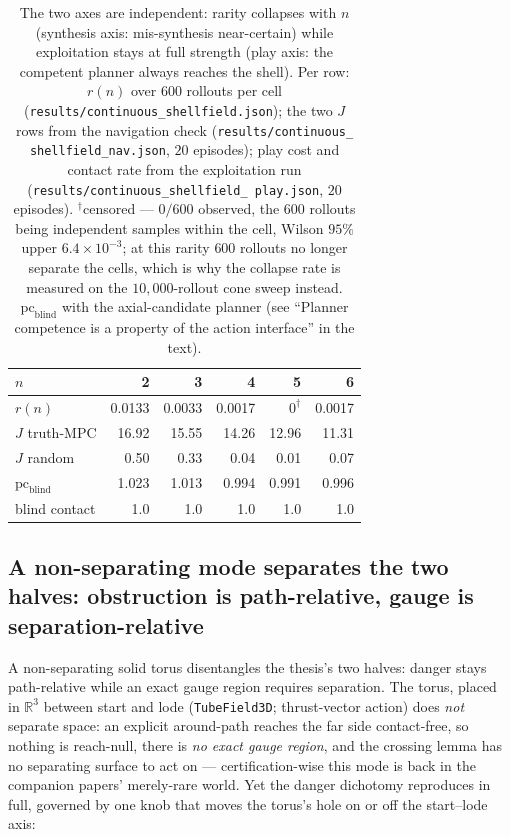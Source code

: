 \documentclass[11pt]{article}
\theoremstyle{remark}
\begin{document}
\begin{table}[h]
\centering
\small
\begin{tabular}{lrrrrr}
\toprule
$n$ & 2 & 3 & 4 & 5 & 6 \\
\midrule
$r(n)$ & 0.0133 & 0.0033 & 0.0017 & $0^{\dagger}$ & 0.0017 \\
$J$ truth-MPC & 16.92 & 15.55 & 14.26 & 12.96 & 11.31 \\
$J$ random & 0.50 & 0.33 & 0.04 & 0.01 & 0.07 \\
$\mathrm{pc}_{\mathrm{blind}}$ & 1.023 & 1.013 & 0.994 & 0.991 & 0.996 \\
blind contact & 1.0 & 1.0 & 1.0 & 1.0 & 1.0 \\
\bottomrule
\end{tabular}
\caption{The two axes are independent: rarity collapses with $n$
(synthesis axis: mis-synthesis near-certain) while exploitation stays at
full strength (play axis: the competent planner always reaches the shell).
Per row: $r(n)$ over $600$ rollouts per cell
(\texttt{results/continuous\_shellfield.json}); the two $J$ rows from
the navigation check (\texttt{results/continuous\_\allowbreak
shellfield\_\allowbreak nav.json}, $20$ episodes); play cost and contact
rate from the exploitation run
(\texttt{results/continuous\_\allowbreak shellfield\_\allowbreak
play.json}, $20$ episodes). $^{\dagger}$censored ---
$0/600$ observed, the $600$ rollouts being independent samples within the
cell, Wilson $95\%$ upper $6.4 \times 10^{-3}$; at this rarity $600$
rollouts no longer separate the cells, which is why the collapse rate is
measured on the $10{,}000$-rollout cone sweep instead.
$\mathrm{pc}_{\mathrm{blind}}$ with the axial-candidate planner (see
``Planner competence is a property of the action interface'' in the
text).}
\label{tab:ndim}
\end{table}

\subsection{A non-separating mode separates the two halves: obstruction
is path-relative, gauge is separation-relative}
\label{sec:tube}

A non-separating solid torus disentangles the thesis's two halves:
danger stays path-relative while an exact gauge region requires
separation. The torus, placed in $\mathbb{R}^3$ between start and lode
(\texttt{TubeField3D}; thrust-vector action) does \emph{not} separate
space: an explicit around-path reaches the far side contact-free, so
nothing is reach-null, there is \emph{no exact gauge region}, and the
crossing lemma has no separating surface to act on --- certification-wise
this mode is back in the companion papers' merely-rare world. Yet the
danger dichotomy reproduces in full, governed by one knob that moves the
torus's hole on or off the start--lode axis:
\end{document}
